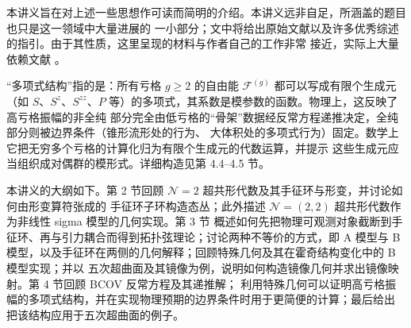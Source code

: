 
本讲义旨在对上述一些思想作可读而简明的介绍。本讲义远非自足，所涵盖的题目也只是这一领域中大量进展的
一小部分；文中将给出原始文献以及许多优秀综述的指引。由于其性质，这里呈现的材料与作者自己的工作非常
接近，实际上大量依赖文献 \cite{ref22,ref26,ref27,ref28}。

\begin{yizhu}[物理图像]
“多项式结构”指的是：所有亏格 $g\ge 2$ 的自由能 $\mathcal{F}^{(g)}$ 都可以写成有限个生成元
（如 $S$、$S^z$、$S^{zz}$、$P$ 等）的多项式，其系数是模参数的函数。物理上，这反映了高亏格振幅的非全纯
部分完全由低亏格的“骨架”数据经反常方程递推决定，全纯部分则被边界条件（锥形流形处的行为、
大体积处的多项式行为）固定。数学上它把无穷多个亏格的计算化归为有限个生成元的代数运算，并提示
这些生成元应当组织成对偶群的模形式。详细构造见第 4.4--4.5 节。
\end{yizhu}

本讲义的大纲如下。第 2 节回顾 $\mathcal N=2$ 超共形代数及其手征环与形变，并讨论如何由形变算符张成的
手征环子环构造态丛；此外描述 $\mathcal{N}=(2,2)$ 超共形代数作为非线性 sigma 模型的几何实现。第 3 节
概述如何先把物理可观测对象截断到手征环、再与引力耦合而得到拓扑弦理论；讨论两种不等价的方式，即
A 模型与 B 模型，以及手征环在两侧的几何解释；回顾特殊几何及其在霍奇结构变化中的 B 模型实现；并以
五次超曲面及其镜像为例，说明如何构造镜像几何并求出镜像映射。第 4 节回顾 BCOV 反常方程及其递推解；
利用特殊几何可以证明高亏格振幅的多项式结构，并在实现物理预期的边界条件时用于更简便的计算；最后给出
把该结构应用于五次超曲面的例子。
